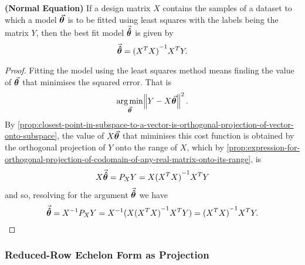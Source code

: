 \documentclass[../MathsNotesBase.tex]{subfiles}
\begin{document}
{	\bigskip
	\begin{corollary}\label{coro:normal-equation}
		\textbf{(Normal Equation)} If a design matrix $X$ contains the samples of a dataset to which a model $\vec{\bm{\theta}}$ is to be fitted using least squares with the labels being the matrix $Y$, then the best fit model ${ \vec{\bm{\hat\theta}} }$ is given by
			\[ \vec{\bm{\hat\theta}} = {(X^T X)}^{-1} X^T Y. \]
	\end{corollary}
	\begin{proof}
		Fitting the model using the least squares method means finding the value of $\vec{\bm{\theta}}$ that minimises the squared error. That is
		\[ \operatorname*{arg\,min}_{\vec{\bm{\theta}}} \norm{Y - X\vec{\bm{\theta}}}^2. \]
		By \autoref{prop:closest-point-in-subspace-to-a-vector-is-orthogonal-projection-of-vector-onto-subspace}, the value of $X\vec{\bm{\theta}}$ that miminises this cost function is obtained by the orthogonal projection of $Y$ onto the range of $X$, which by \autoref{prop:expression-for-orthogonal-projection-of-codomain-of-any-real-matrix-onto-its-range}, is 
		\[ X\vec{\bm{\hat\theta}} = P_X Y = X {(X^T X)}^{-1} X^T Y \]
		and so, resolving for the argument $\vec{\bm{\hat\theta}}$ we have
		\[ \vec{\bm{\hat\theta}} = {X}^{-1} P_X Y = {X}^{-1} (X {(X^T X)}^{-1} X^T Y) = {(X^T X)}^{-1} X^T Y.   \qedhere \]
	\end{proof}


	\bigskip
	\subsubsection{Reduced-Row Echelon Form as Projection}	

}
\end{document}
